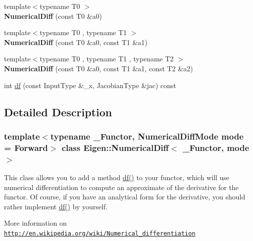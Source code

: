 \begin{DoxyCompactItemize}
\item 
\mbox{\label{class_eigen_1_1_numerical_diff_aa0c9b360ead36c6ecb822776549b57bf}} 
{\footnotesize template$<$typename T0 $>$ }\\{\bfseries Numerical\+Diff} (const T0 \&a0)
\item 
\mbox{\label{class_eigen_1_1_numerical_diff_aff5b053135d4a9eb03e1ece6cd621f5f}} 
{\footnotesize template$<$typename T0 , typename T1 $>$ }\\{\bfseries Numerical\+Diff} (const T0 \&a0, const T1 \&a1)
\item 
\mbox{\label{class_eigen_1_1_numerical_diff_af08a8d5c3ea7bc1eb31c6776a161e1fc}} 
{\footnotesize template$<$typename T0 , typename T1 , typename T2 $>$ }\\{\bfseries Numerical\+Diff} (const T0 \&a0, const T1 \&a1, const T2 \&a2)
\item 
int \hyperlink{class_eigen_1_1_numerical_diff_a8fc63f1c3307cc6e61dc4d70c57b5037}{df} (const Input\+Type \&\+\_\+x, Jacobian\+Type \&jac) const
\end{DoxyCompactItemize}


\subsection{Detailed Description}
\subsubsection*{template$<$typename \+\_\+\+Functor, Numerical\+Diff\+Mode mode = Forward$>$\newline
class Eigen\+::\+Numerical\+Diff$<$ \+\_\+\+Functor, mode $>$}

This class allows you to add a method \hyperlink{class_eigen_1_1_numerical_diff_a8fc63f1c3307cc6e61dc4d70c57b5037}{df()} to your functor, which will use numerical differentiation to compute an approximate of the derivative for the functor. Of course, if you have an analytical form for the derivative, you should rather implement \hyperlink{class_eigen_1_1_numerical_diff_a8fc63f1c3307cc6e61dc4d70c57b5037}{df()} by yourself.

More information on \href{http://en.wikipedia.org/wiki/Numerical_differentiation}{\tt http\+://en.\+wikipedia.\+org/wiki/\+Numerical\+\_\+differentiation}

